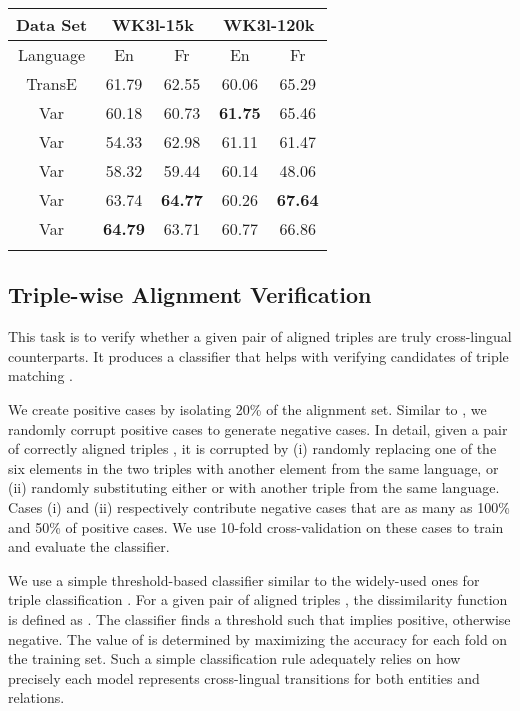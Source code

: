 \documentclass{article}
\def\inv{\vspace{-0.1cm}}
\begin{document}
\begin{table*}[t!]
\begin{minipage}[t]{0.3\linewidth}
\vspace{-1em}
{\scriptsize
\begin{tabular}{c|cc|cc}
\bhline
Data Set & \multicolumn{2}{c|}{WK3l-15k} & \multicolumn{2}{c}{WK3l-120k}\\
\hline
Language & En & Fr & En & Fr\\
\bhline
TransE&61.79&62.55&60.06&65.29\\
Var&60.18&60.73&\textbf{61.75}&65.46\\
Var&54.33&62.98&61.11&61.47\\
Var&58.32&59.44&60.14&48.06\\
Var&63.74&\textbf{64.77}&60.26&\textbf{67.64}\\
Var&\textbf{64.79}&63.71&60.77&66.86\\
\bhline
\end{tabular}
}
\end{minipage}
\vspace{-1.5em}
\end{table*}

\inv\inv
\subsection{Triple-wise Alignment Verification}

This task is to verify whether a given pair of aligned triples are truly cross-lingual counterparts. It produces a classifier that helps with verifying candidates of triple matching \cite{nguyen2011multi,rinser2013cross}. \par

 We create positive cases by isolating 20\% of the alignment set. Similar to \cite{socher2013reasoning}, we randomly corrupt positive cases to generate negative cases. In detail, given a pair of correctly aligned triples , it is corrupted by (i) randomly replacing one of the six elements in the two triples with another element from the same language, or (ii) randomly substituting either  or  with another triple from the same language. Cases (i) and (ii) respectively contribute
negative cases that are as many as 100\% and 50\% of positive cases.
We use 10-fold cross-validation on these cases to train and evaluate the classifier.



We use a simple threshold-based classifier similar to the widely-used ones for triple classification \cite{socher2013reasoning,wang2014knowledge,lin2015learning}. For a given pair of aligned triples   , the dissimilarity function is defined as   . The classifier finds a threshold  such that  implies positive, otherwise negative. The value of  is determined by maximizing the accuracy for each fold on the training set. Such a simple classification rule adequately relies on how precisely each model represents cross-lingual transitions for both entities and relations.
\end{document}
